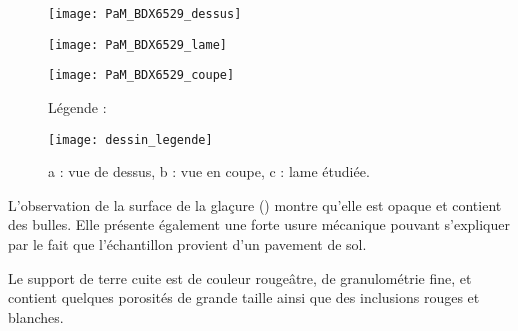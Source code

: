 \begin{figure}[htb]
  \begin{minipage}[t]{0.5\textwidth}
    \centerfloat
    \vspace*{0pt}
    \texttt{[image: PaM\_BDX6529\_dessus]}
  \end{minipage}%
  \quad%
  \begin{minipage}[t]{0.5\textwidth}
    \centerfloat
    \vspace*{0pt}
    \texttt{[image: PaM\_BDX6529\_lame]}
  \end{minipage}

  \bigskip

  \begin{minipage}[t]{0.5\textwidth}
    \centerfloat
    \vspace*{0pt}
    \texttt{[image: PaM\_BDX6529\_coupe]}
  \end{minipage}%
  \quad%
  \begin{minipage}[t]{0.5\textwidth}
    \vspace*{0pt}
    Légende :

    \texttt{[image: dessin\_legende]}
  \end{minipage}
  \caption{\legendeB 
           a : vue de dessus, b : vue en coupe, c : lame étudiée.}
  \label{dessin:6529}
\end{figure}

L'observation de la surface de la glaçure () montre 
qu'elle est opaque et contient des bulles. Elle présente également 
une forte usure mécanique pouvant s'expliquer par le fait que 
l'échantillon provient d'un pavement de sol.

Le support de terre cuite est de couleur rougeâtre, de granulométrie 
fine, et contient quelques porosités de grande taille ainsi que des 
inclusions rouges et blanches.

